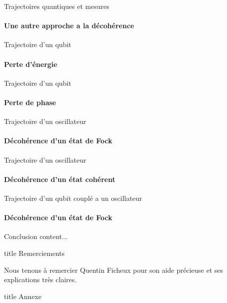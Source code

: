 \documentclass[11pt]{beamer}
\begin{document}
\begin{frame}{Trajectoires quantiques et mesures}
\framesubtitle{Une autre approche a la décohérence}
\end{frame}

\begin{frame}{Trajectoire d'un qubit}
\framesubtitle{Perte d'énergie}
\end{frame}

\begin{frame}{Trajectoire d'un qubit}
\framesubtitle{Perte de phase}
\end{frame}

\begin{frame}{Trajectoire d'un oscillateur}
\framesubtitle{Décohérence d'un état de Fock}
\end{frame}

\begin{frame}{Trajectoire d'un oscillateur}
\framesubtitle{Décohérence d'un état cohérent}
\end{frame}


\begin{frame}{Trajectoire d'un qubit couplé a un oscillateur}
\framesubtitle{Décohérence d'un état de Fock}
\end{frame}

\begin{frame}{Conclusion}
content...
\end{frame}

\begin{frame}[plain]
\begin{beamercolorbox}[sep=8pt,center]{title}
Remerciements%
\end{beamercolorbox}
\centering
Nous tenons à remercier Quentin Ficheux pour son aide précieuse et ses explications très claires. %

\end{frame}

\appendix
{}

\begin{frame}
\vfill
\begin{beamercolorbox}[sep=8pt,center]{title}
Annexe
\end{beamercolorbox}
\vfill
\end{frame}
\end{document}
